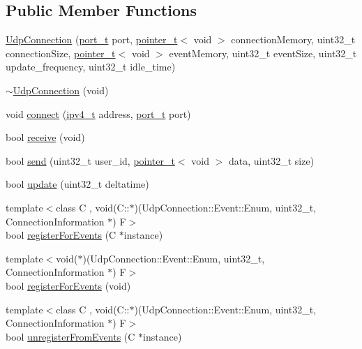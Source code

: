 \subsection*{Public Member Functions}
\begin{DoxyCompactItemize}
\item 
\hyperlink{classcrap_1_1_udp_connection_a795feae71a319cc5a82ea1f610e4a494}{Udp\+Connection} (\hyperlink{namespacecrap_a21d8c14ae6ca715c519ff369042149dd}{port\+\_\+t} port, \hyperlink{structcrap_1_1pointer__t}{pointer\+\_\+t}$<$ void $>$ connection\+Memory, uint32\+\_\+t connection\+Size, \hyperlink{structcrap_1_1pointer__t}{pointer\+\_\+t}$<$ void $>$ event\+Memory, uint32\+\_\+t event\+Size, uint32\+\_\+t update\+\_\+frequency, uint32\+\_\+t idle\+\_\+time)
\item 
\hyperlink{classcrap_1_1_udp_connection_a14c8e72ef3a8705e11f087bcbe2cc398}{$\sim$\+Udp\+Connection} (void)
\item 
void \hyperlink{classcrap_1_1_udp_connection_ace8c212fb39f44c61318a0871189366f}{connect} (\hyperlink{namespacecrap_a9ef32279067e77955c9f269926a331ee}{ipv4\+\_\+t} address, \hyperlink{namespacecrap_a21d8c14ae6ca715c519ff369042149dd}{port\+\_\+t} port)
\item 
bool \hyperlink{classcrap_1_1_udp_connection_ad8ac88306bae15d9b1c3f20ecf97f22e}{receive} (void)
\item 
bool \hyperlink{classcrap_1_1_udp_connection_a6fc43145e106f40c66c10b314fecd167}{send} (uint32\+\_\+t user\+\_\+id, \hyperlink{structcrap_1_1pointer__t}{pointer\+\_\+t}$<$ void $>$ data, uint32\+\_\+t size)
\item 
bool \hyperlink{classcrap_1_1_udp_connection_affad8946093cb93e228af5452cee5bee}{update} (uint32\+\_\+t deltatime)
\item 
{\footnotesize template$<$class C , void(\+C\+::$\ast$)(\+Udp\+Connection\+::\+Event\+::\+Enum, uint32\+\_\+t, Connection\+Information $\ast$) F$>$ }\\bool \hyperlink{classcrap_1_1_udp_connection_a48692fd1616896236c3e1ad1feadaf4f}{register\+For\+Events} (C $\ast$instance)
\item 
{\footnotesize template$<$void($\ast$)(\+Udp\+Connection\+::\+Event\+::\+Enum, uint32\+\_\+t, Connection\+Information $\ast$) F$>$ }\\bool \hyperlink{classcrap_1_1_udp_connection_a00cc11cb8bbdc3afaa88713da70f9918}{register\+For\+Events} (void)
\item 
{\footnotesize template$<$class C , void(\+C\+::$\ast$)(\+Udp\+Connection\+::\+Event\+::\+Enum, uint32\+\_\+t, Connection\+Information $\ast$) F$>$ }\\bool \hyperlink{classcrap_1_1_udp_connection_ae5aab27d269cef91ce602095b6f77c51}{unregister\+From\+Events} (C $\ast$instance)

\end{DoxyCompactItemize}

